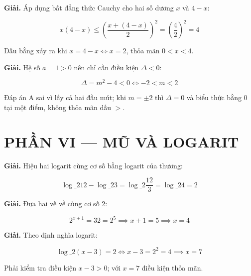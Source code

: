 \documentclass[11pt, a4paper]{article}
\begin{document}
\vspace{0.3cm}
\begin{dapan}[35 — Đáp án D]

\textbf{Giải.} Áp dụng bất đẳng thức Cauchy cho hai số dương $x$ và $4 - x$:

$$x(4 - x) \le \left(\dfrac{x + (4-x)}{2}\right)^2 = \left(\dfrac{4}{2}\right)^2 = 4$$

Dấu bằng xảy ra khi $x = 4 - x \iff x = 2$, thỏa mãn $0 < x < 4$.


\end{dapan}
\vspace{0.3cm}
\begin{dapan}[36 — Đáp án B]

\textbf{Giải.} Hệ số $a = 1 > 0$ nên chỉ cần điều kiện $\Delta < 0$:

$$\Delta = m^2 - 4 < 0 \iff -2 < m < 2$$

 Đáp án A sai vì lấy cả hai đầu mút; khi $m = \pm 2$ thì $\Delta = 0$ và biểu thức bằng 0 tại một điểm, không thỏa mãn dấu $>$.

\section{PHẦN VI — MŨ VÀ LOGARIT}


\end{dapan}
\vspace{0.3cm}
\begin{dapan}[37 — Đáp án D]

\textbf{Giải.} Hiệu hai logarit cùng cơ số bằng logarit của thương:

$$\log\_2 12 - \log\_2 3 = \log\_2 \dfrac{12}{3} = \log\_2 4 = 2$$


\end{dapan}
\vspace{0.3cm}
\begin{dapan}[38 — Đáp án A]

\textbf{Giải.} Đưa hai vế về cùng cơ số 2:

$$2^{x+1} = 32 = 2^5 \implies x + 1 = 5 \implies x = 4$$


\end{dapan}
\vspace{0.3cm}
\begin{dapan}[39 — Đáp án C]

\textbf{Giải.} Theo định nghĩa logarit:

$$\log\_2(x - 3) = 2 \iff x - 3 = 2^2 = 4 \implies x = 7$$

 Phải kiểm tra điều kiện $x - 3 > 0$; với $x = 7$ điều kiện thỏa mãn.


\end{dapan}
\end{document}
